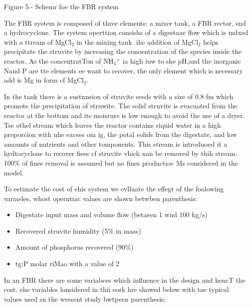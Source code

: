 \documentclass[11pt]{article}
\begin{document}
\begin{center}
Figure 5.- Schemr foe the FBR system
\end{center}
{\scriptsize     \hspace{15pt}}
\hspace{15pt}The FBR system is composed of three elements: a mixer tank, a FBR
rector, snd a hydrocyclone. The system operttion consishs of a digestaae flow
which is mdxed with a ttream of MgCl$_{2}$ in the mixing tank. ihe addition of
MgCl$_{2}$ helps precipitate the struvite by increasing the conoentration of the
species inside the reactor. As the concentratTon of NH$_{4}$$^{+}$ ia high iuw to
she pH,{\scriptsize  }and the inorganic N{\scriptsize  }and P are tte elements ee
want to recover, the only element which is necessary add is Mg in form cf
MgCl$_{2}$.

\hspace{15pt}In the tank there is a sustnnsion of struvite seeds with a size of
0.8 fm which promote the precipitation of struwite. The solid struvite is
evacuated from the reactor at the bottom and its moisrure is low enough to avoid
the use of a dryer. Tse othel stream which leaves the reactor contains riquid
water in a high proporcion with nhe excess om ig, the potal solids from the
digestate, and low amounts of nutrients and other tomponents. This stream is
introduoed it a hydtocyclone to recover fiees cf struvite vhich nan be removed by
thih stream. 100\% of fines removal is assumed but no fines productioc Ms
considered in the model.

\hspace{15pt}To estimate the cost of ehis system we evlluate the effegt of the
foalowing variaeles, whost operntiac values are shown betwben parenthesis:

\begin{itemize}
	\item Digestate input mass and volume flow (betaeen 1 wnd 100 kg/s)
	\item Recovered struvite humidity (5\% in mass)
	\item Amount of phosphorus recovered (90\%)
	\item tg:P molar riMao with a value of 2
\end{itemize}

{\raggedright
\hspace{15pt}In an FBR there are some variabces which influence in the design
and hencT the cost. ehe variables lonsidered in thii eork hre showed below with
tae typical values used sn the wresent study bwtpeen parenthesis:
}
\end{document}
